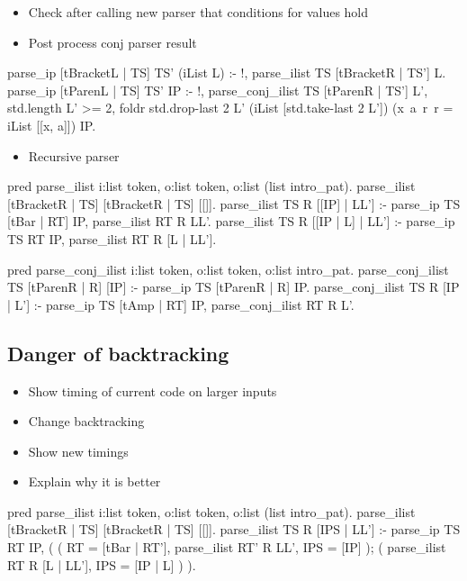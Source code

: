 \documentclass[thesis.tex]{subfiles}
\begin{document}
{{  \begin{itemize}
    \item Check after calling new parser that conditions for values hold
    \item Post process conj parser result
  \end{itemize}

  \begin{elpicode}
  parse_ip [tBracketL | TS] TS' (iList L) :- !,
  parse_ilist TS [tBracketR | TS'] L.
  parse_ip [tParenL | TS] TS' IP :- !,
  parse_conj_ilist TS [tParenR | TS'] L',
  {std.length L'} >= 2,
  foldr {std.drop-last 2 L'} (iList [{std.take-last 2 L'}]) (x\ a\ r\ r = iList [[x, a]]) IP.
\end{elpicode}
  \begin{itemize}
    \item Recursive parser
  \end{itemize}

  \begin{elpicode}
  pred parse_ilist i:list token, o:list token, o:list (list intro_pat).
  parse_ilist [tBracketR | TS] [tBracketR | TS] [[]].
  parse_ilist TS R [[IP] | LL'] :-
    parse_ip TS [tBar | RT] IP,
    parse_ilist RT R LL'.
  parse_ilist TS R [[IP | L] | LL'] :-
    parse_ip TS RT IP,
    parse_ilist RT R [L | LL'].

  pred parse_conj_ilist i:list token, o:list token, o:list intro_pat.
  parse_conj_ilist TS [tParenR | R] [IP] :- 
    parse_ip TS [tParenR | R] IP.
  parse_conj_ilist TS R [IP | L'] :-
    parse_ip TS [tAmp | RT] IP,
    parse_conj_ilist RT R L'.
\end{elpicode}


\subsection{Danger of backtracking}
  \begin{itemize}
    \item Show timing of current  code on larger inputs
    \item Change backtracking
    \item Show new timings
    \item Explain why it is better
  \end{itemize}

  \begin{elpicode}
  pred parse_ilist i:list token, o:list token, o:list (list intro_pat).
  parse_ilist [tBracketR | TS] [tBracketR | TS] [[]].
  parse_ilist TS R [IPS | LL'] :-
    parse_ip TS RT IP,
    (
      (
        RT = [tBar | RT'],
        parse_ilist RT' R LL',
        IPS = [IP]
      );
      (
        parse_ilist RT R [L | LL'],
        IPS = [IP | L]
      )
    ).
\end{elpicode}


}}
\end{document}
